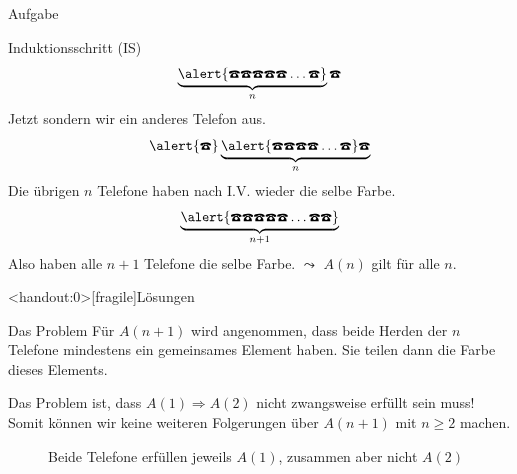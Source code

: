 {\begin{frame}[fragile]{Aufgabe}
{\begin{alertblock}{Induktionsschritt (IS)}
				\[\underbrace{\alert{\text{\Telefon}\text{\Telefon}\text{\Telefon}\text{\Telefon}\text{\Telefon}\dots\text{\Telefon}}}_{n}\text{\Telefon}\]
				Jetzt sondern wir ein anderes Telefon aus.
				\[\alert{\text{\Telefon}}\underbrace{\alert{\text{\Telefon}\text{\Telefon}\text{\Telefon}\text{\Telefon}\dots\text{\Telefon}}\text{\Telefon}}_{n}\]
				Die übrigen $n$ Telefone haben nach I.V. wieder die selbe Farbe.
				\[\underbrace{\alert{\text{\Telefon}\text{\Telefon}\text{\Telefon}\text{\Telefon}\text{\Telefon}\dots\text{\Telefon}\text{\Telefon}}}_{n+1}\]
				Also haben alle $n+1$ Telefone die selbe Farbe.
				$\leadsto$ $A(n)$ gilt für alle $n$.
			\end{alertblock}
		}
	\end{frame}
}

{
	\begin{frame}<handout:0>[fragile]{Lösungen}
		\small{
			\begin{block}{Das Problem}
				Für $A(n+1)$ wird angenommen, dass beide Herden der $n$ Telefone mindestens ein gemeinsames Element haben. 
				Sie teilen dann die Farbe dieses Elements. 

				Das Problem ist, dass $A(1) \Rightarrow A(2)$ nicht zwangsweise erfüllt sein muss! Somit können wir keine weiteren Folgerungen über $A(n+1)$ mit $n \geq 2$ machen.
				
				\begin{figure}
					\caption{Beide Telefone erfüllen jeweils $A(1)$, zusammen aber nicht $A(2)$}
				\end{figure}


\end{block}}
\end{frame}}
